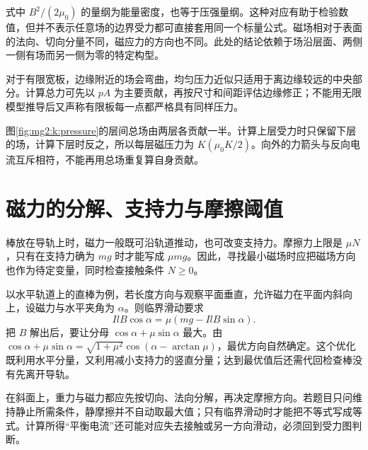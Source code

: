 式中 $B^2/(2\mu_0)$ 的量纲为能量密度，也等于压强量纲。这种对应有助于检验数值，但并不表示任意场的边界受力都可直接套用同一个标量公式。磁场相对于表面的法向、切向分量不同，磁应力的方向也不同。此处的结论依赖于场沿层面、两侧一侧有场而另一侧为零的特定构型。


对于有限宽板，边缘附近的场会弯曲，均匀压力近似只适用于离边缘较远的中央部分。计算总力可先以 $pA$ 为主要贡献，再按尺寸和间距评估边缘修正；不能用无限模型推导后又声称有限板每一点都严格具有同样压力。


图\ref{fig:mg2:k:pressure}的层间总场由两层各贡献一半。计算上层受力时只保留下层的场，计算下层时反之，所以每层磁压力为 $K(\mu_0K/2)$。向外的力箭头与反向电流互斥相符，不能再用总场重复算自身贡献。


\section{磁力的分解、支持力与摩擦阈值}
棒放在导轨上时，磁力一般既可沿轨道推动，也可改变支持力。摩擦力上限是 $\mu N$，只有在支持力确为 $mg$ 时才能写成 $\mu mg$。因此，寻找最小磁场时应把磁场方向也作为待定变量，同时检查接触条件 $N\ge0$。


以水平轨道上的直棒为例，若长度方向与观察平面垂直，允许磁力在平面内斜向上，设磁力与水平夹角为 $\alpha$。则临界滑动要求
\[
IlB\cos\alpha=\mu(mg-IlB\sin\alpha).
\]
把 $B$ 解出后，要让分母 $\cos\alpha+\mu\sin\alpha$ 最大。由 $\cos\alpha+\mu\sin\alpha=\sqrt{1+\mu^2}\cos(\alpha-\arctan\mu)$，最优方向自然确定。这个优化既利用水平分量，又利用减小支持力的竖直分量；达到最优值后还需代回检查棒没有先离开导轨。


在斜面上，重力与磁力都应先按切向、法向分解，再决定摩擦方向。若题目只问维持静止所需条件，静摩擦并不自动取最大值；只有临界滑动时才能把不等式写成等式。计算所得“平衡电流”还可能对应失去接触或另一方向滑动，必须回到受力图判断。



